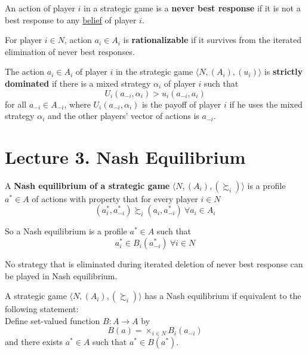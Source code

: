 \documentclass[11pt]{article}
\begin{document}
			\begin{definition}[59.1]
				An action of player $i$ in a strategic game is a \textbf{never best response} if it is not a best response to any \ul{belief} of player $i$.
			\end{definition}
			
			\begin{definition}[lec.2]
				For player $i \in N$, action $a_i \in A_i$ is \textbf{rationalizable} if it survives from the iterated elimination of never best responses.
			\end{definition}
			
			\begin{definition}[59.2]
				The action $a_i \in A_i$ of player $i$ in the strategic game $\langle N, (A_i), (u_i) \rangle$ is \textbf{strictly dominated} if there is a mixed strategy $\alpha_i$ of player $i$ such that 
				\[
					U_i(a_{-i}, \alpha_i) > u_i(a_{-i}, a_i)
				\]
				for all $a_{-i} \in A_{-i}$, where $U_i(a_{-i}, \alpha_i)$ is the payoff of player $i$ if he uses the mixed strategy $\alpha_i$ and the other players' vector of actions is $a_{-i}$.
			\end{definition}
		
		
	\section{Lecture 3. Nash Equilibrium}
		\begin{definition}[14.1]
			A \textbf{Nash equilibrium of a strategic game} $\langle N, (A_i), (\succsim_i) \rangle$ is a profile $a^* \in A$ of actions with property that for every player $i \in N$
			\[
				(a_i^*, a^*_{-i}) \succsim_i (a_i, a^*_{-i})\ \forall a_i \in A_i
			\]
		\end{definition}
		
		\begin{proposition}
			So a Nash equilibrium is a profile $a^* \in A$ such that
			\[
				a^*_i \in B_i(a^*_{-i})\ \forall i \in N
			\]
		\end{proposition}
		
		\begin{proposition}[lec.3]
			No strategy that is eliminated during iterated deletion of never best response can be played in Nash equilibrium.
		\end{proposition}
		
		\begin{lemma}[pg.19]
			A strategic game $\langle N, (A_i), (\succsim_i) \rangle$ has a Nash equilibrium if equivalent to the following statement:\\
			Define set-valued function $B: A \to A$ by 
			\[
				B(a) = \times_{i\in N} B_i (a_{-i})
			\]
			and there exists $a^* \in A$ such that $a^* \in B(a^*)$.
		\end{lemma}
	
\end{document}
